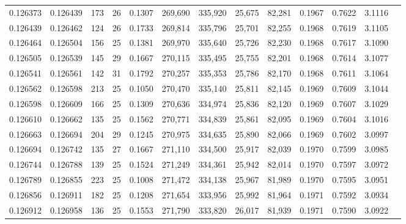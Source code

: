 \begin{tabular}{rrrrrrrrrrrrr}
0.126373 & 0.126439 & 173 &  26 &                                     0.1307 & 269,690 & 335,920 &  25,675 &  82,281 & 0.1967 & 0.7622 & 3.1116 \\
0.126439 & 0.126462 & 124 &  26 &                                     0.1733 & 269,814 & 335,796 &  25,701 &  82,255 & 0.1968 & 0.7619 & 3.1105 \\
0.126464 & 0.126504 & 156 &  25 &                                     0.1381 & 269,970 & 335,640 &  25,726 &  82,230 & 0.1968 & 0.7617 & 3.1090 \\
0.126505 & 0.126539 & 145 &  29 &                                     0.1667 & 270,115 & 335,495 &  25,755 &  82,201 & 0.1968 & 0.7614 & 3.1077 \\
0.126541 & 0.126561 & 142 &  31 &                                     0.1792 & 270,257 & 335,353 &  25,786 &  82,170 & 0.1968 & 0.7611 & 3.1064 \\
0.126562 & 0.126598 & 213 &  25 &                                     0.1050 & 270,470 & 335,140 &  25,811 &  82,145 & 0.1969 & 0.7609 & 3.1044 \\
0.126598 & 0.126609 & 166 &  25 &                                     0.1309 & 270,636 & 334,974 &  25,836 &  82,120 & 0.1969 & 0.7607 & 3.1029 \\
0.126610 & 0.126662 & 135 &  25 &                                     0.1562 & 270,771 & 334,839 &  25,861 &  82,095 & 0.1969 & 0.7604 & 3.1016 \\
0.126663 & 0.126694 & 204 &  29 &                                     0.1245 & 270,975 & 334,635 &  25,890 &  82,066 & 0.1969 & 0.7602 & 3.0997 \\
0.126694 & 0.126742 & 135 &  27 &                                     0.1667 & 271,110 & 334,500 &  25,917 &  82,039 & 0.1970 & 0.7599 & 3.0985 \\
0.126744 & 0.126788 & 139 &  25 &                                     0.1524 & 271,249 & 334,361 &  25,942 &  82,014 & 0.1970 & 0.7597 & 3.0972 \\
0.126789 & 0.126855 & 223 &  25 &                                     0.1008 & 271,472 & 334,138 &  25,967 &  81,989 & 0.1970 & 0.7595 & 3.0951 \\
0.126856 & 0.126911 & 182 &  25 &                                     0.1208 & 271,654 & 333,956 &  25,992 &  81,964 & 0.1971 & 0.7592 & 3.0934 \\
0.126912 & 0.126958 & 136 &  25 &                                     0.1553 & 271,790 & 333,820 &  26,017 &  81,939 & 0.1971 & 0.7590 & 3.0922 \\

\end{tabular}
